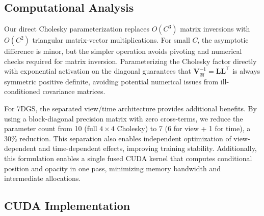 \documentclass{article}
\begin{document}
\subsection{Computational Analysis}

Our direct Cholesky parameterization replaces $O(C^3)$ matrix inversions with $O(C^2)$ triangular matrix-vector multiplications. For small $C$, the asymptotic difference is minor, but the simpler operation avoids pivoting and numerical checks required for matrix inversion. Parameterizing the Cholesky factor directly with exponential activation on the diagonal guarantees that $\mathbf{V}_{qq}^{-1} = \mathbf{L}\mathbf{L}^\top$ is always symmetric positive definite, avoiding potential numerical issues from ill-conditioned covariance matrices.

For 7DGS, the separated view/time architecture provides additional benefits. By using a block-diagonal precision matrix with zero cross-terms, we reduce the parameter count from 10 (full $4 \times 4$ Cholesky) to 7 (6 for view + 1 for time), a 30\% reduction. This separation also enables independent optimization of view-dependent and time-dependent effects, improving training stability. Additionally, this formulation enables a single fused CUDA kernel that computes conditional position and opacity in one pass, minimizing memory bandwidth and intermediate allocations.

\subsection{CUDA Implementation}
\end{document}
